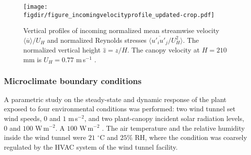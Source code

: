 	
\begin{figure}[t]
	\centering
	\texttt{[image: \\figdir/figure\_incomingvelocityprofile\_updated-crop.pdf]}
	\caption{Vertical profiles of incoming  normalized mean streamwise velocity $\langle \overline{u} \rangle / U_H$ and  normalized Reynolds stresses $\langle \overline{u'_i u'_j}/U_H^2 \rangle$. The normalized vertical height  $\hat{z}=z/H$. The canopy velocity at $H=210$ mm is $U_H = 0.77$ m\,s$^{-1}$ \citep{Tsalicoglou2018}.}
	\label{fig:incomingvelocityprofile}
\end{figure}

\subsubsection*{Microclimate boundary conditions}
A parametric study on the steady-state and dynamic response of the plant exposed to four environmental conditions was performed: two wind tunnel set wind speeds, $0$ and $1$ m\,s$^{-2}$, and two plant-canopy incident solar radiation levels, $0$ and $100$ W\,m$^{-2}$. A $100$ W\,m$^{-2}$ . The air temperature and the relative humidity inside the wind tunnel were $21$ $^{\circ}$C and $25$\% RH, where the condition was coarsely regulated by the HVAC system of the wind tunnel facility. 

